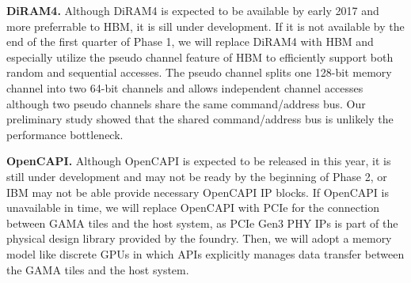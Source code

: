 \noindent
\textbf{DiRAM4.} Although DiRAM4 is expected to be available by early 2017 and more preferrable to HBM, it is sill under development.
If it is not available by the end of the first quarter of Phase 1, we will replace DiRAM4 with HBM and especially utilize the pseudo channel feature of HBM to efficiently support both random and sequential accesses. 
The pseudo channel splits one 128-bit memory channel into two 64-bit channels and allows independent channel accesses although two pseudo channels share the same command/address bus.
Our preliminary study showed that the shared command/address bus is unlikely the performance bottleneck.


\vspace{3pt}
\noindent
\textbf{OpenCAPI.} Although OpenCAPI is expected to be released in this year, it is still under development and may not be ready by the beginning of Phase 2, or IBM may not be able provide necessary OpenCAPI IP blocks.
If OpenCAPI is unavailable in time, we will replace OpenCAPI with PCIe for the connection between GAMA tiles and the host system, as PCIe Gen3 PHY IPs is part of the physical design library provided by the foundry.
Then, we will adopt a memory model like discrete GPUs in which APIs explicitly manages data transfer between the GAMA tiles and the host system.


